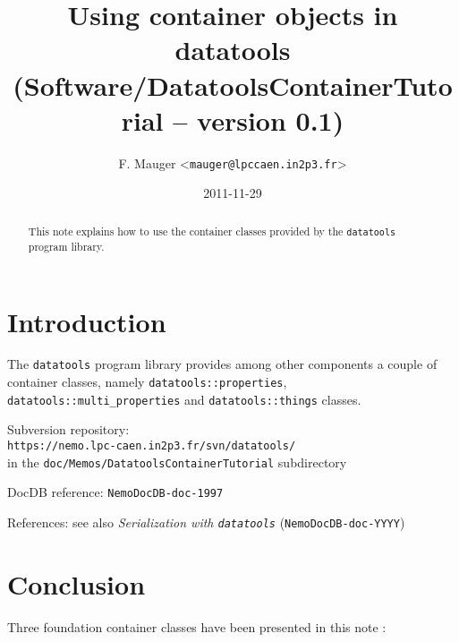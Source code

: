 \documentclass[a4paper,12pt]{article}
\title{Using container objects in datatools\\%
{\small{(Software/DatatoolsContainerTutorial -- version 0.1)}}}
\author{F. Mauger <\texttt{mauger@lpccaen.in2p3.fr}>}
\date{2011-11-29}
\newcommand{\pn}{\par\noindent}
\begin{document}
\maketitle

\begin{abstract}
This note  explains how to use  the container classes  provided by the
\texttt{datatools} program library.
\end{abstract}

\tableofcontents

\section{Introduction}

\pn  The  \texttt{datatools}  program library  provides  among  other
components     a    couple     of     container    classes,     namely
\texttt{datatools::properties},   \texttt{datatools::multi\_properties}
and \texttt{datatools::things} classes.

\vskip 5mm
\pn
Subversion repository:\\
\texttt{https://nemo.lpc-caen.in2p3.fr/svn/datatools/} \\
in the \texttt{doc/Memos/DatatoolsContainerTutorial} subdirectory
\pn
DocDB reference: \texttt{NemoDocDB-doc-1997}
\pn
References: see also \textit{Serialization with \texttt{datatools}} 
(\texttt{NemoDocDB-doc-YYYY})

\clearpage


\clearpage


\clearpage


\clearpage

\section{Conclusion}

\pn  Three foundation container  classes have  been presented  in this
note :
\end{document}

